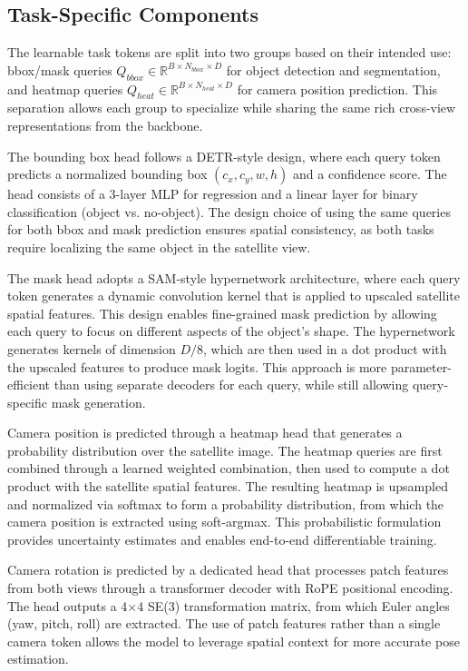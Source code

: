 \subsection{Task-Specific Components}

The learnable task tokens are split into two groups based on their intended use: bbox/mask queries $Q_{bbox} \in \mathbb{R}^{B \times N_{bbox} \times D}$ for object detection and segmentation, and heatmap queries $Q_{heat} \in \mathbb{R}^{B \times N_{heat} \times D}$ for camera position prediction. This separation allows each group to specialize while sharing the same rich cross-view representations from the backbone.

The bounding box head follows a DETR-style design, where each query token predicts a normalized bounding box $(c_x, c_y, w, h)$ and a confidence score. The head consists of a 3-layer MLP for regression and a linear layer for binary classification (object vs. no-object). The design choice of using the same queries for both bbox and mask prediction ensures spatial consistency, as both tasks require localizing the same object in the satellite view.

The mask head adopts a SAM-style hypernetwork architecture, where each query token generates a dynamic convolution kernel that is applied to upscaled satellite spatial features. This design enables fine-grained mask prediction by allowing each query to focus on different aspects of the object's shape. The hypernetwork generates kernels of dimension $D/8$, which are then used in a dot product with the upscaled features to produce mask logits. This approach is more parameter-efficient than using separate decoders for each query, while still allowing query-specific mask generation.

Camera position is predicted through a heatmap head that generates a probability distribution over the satellite image. The heatmap queries are first combined through a learned weighted combination, then used to compute a dot product with the satellite spatial features. The resulting heatmap is upsampled and normalized via softmax to form a probability distribution, from which the camera position is extracted using soft-argmax. This probabilistic formulation provides uncertainty estimates and enables end-to-end differentiable training.

Camera rotation is predicted by a dedicated head that processes patch features from both views through a transformer decoder with RoPE positional encoding. The head outputs a 4$\times$4 SE(3) transformation matrix, from which Euler angles (yaw, pitch, roll) are extracted. The use of patch features rather than a single camera token allows the model to leverage spatial context for more accurate pose estimation.


